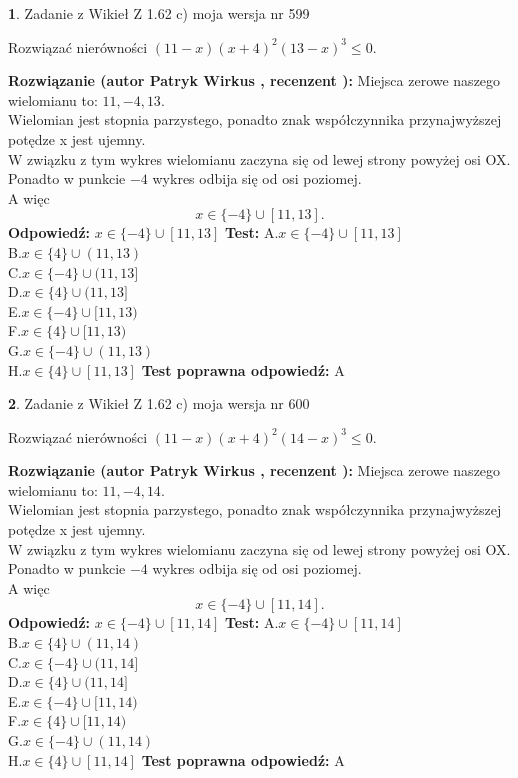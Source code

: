 \documentclass[12pt, a4paper]{article}
\theoremstyle{definition} %
\newtheorem{zad}{}
\newcommand{\zadStart}[1]{\begin{zad}#1\newline}
\newcommand{\zadStop}{\end{zad}}
\newcommand{\rozwStart}[2]{\noindent \textbf{Rozwiązanie (autor #1 , recenzent #2): }\newline}
\newcommand{\rozwStop}{\newline}
\newcommand{\odpStart}{\noindent \textbf{Odpowiedź:}\newline}
\newcommand{\odpStop}{\newline}
\newcommand{\testStart}{\noindent \textbf{Test:}\newline}
\newcommand{\testStop}{\newline}
\newcommand{\kluczStart}{\noindent \textbf{Test poprawna odpowiedź:}\newline}
\newcommand{\kluczStop}{\newline}
\begin{document}
\zadStart{Zadanie z Wikieł Z 1.62 c) moja wersja nr 599}

Rozwiązać nierówności $(11-x)(x+4)^{2}(13-x)^{3}\le0$.
\zadStop
\rozwStart{Patryk Wirkus}{}
Miejsca zerowe naszego wielomianu to: $11, -4, 13$.\\
Wielomian jest stopnia parzystego, ponadto znak współczynnika przy\linebreak najwyższej potędze x jest ujemny.\\ W związku z tym wykres wielomianu zaczyna się od lewej strony powyżej osi OX.\\
Ponadto w punkcie $-4$ wykres odbija się od osi poziomej.\\
A więc $$x \in \{-4\} \cup [11,13].$$
\rozwStop
\odpStart
$x \in \{-4\} \cup [11,13]$
\odpStop
\testStart
A.$x \in \{-4\} \cup [11,13]$\\
B.$x \in \{4\} \cup (11,13)$\\
C.$x \in \{-4\} \cup (11,13]$\\
D.$x \in \{4\} \cup (11,13]$\\
E.$x \in \{-4\} \cup [11,13)$\\
F.$x \in \{4\} \cup [11,13)$\\
G.$x \in \{-4\} \cup (11,13)$\\
H.$x \in \{4\} \cup [11,13]$
\testStop
\kluczStart
A
\kluczStop



\zadStart{Zadanie z Wikieł Z 1.62 c) moja wersja nr 600}

Rozwiązać nierówności $(11-x)(x+4)^{2}(14-x)^{3}\le0$.
\zadStop
\rozwStart{Patryk Wirkus}{}
Miejsca zerowe naszego wielomianu to: $11, -4, 14$.\\
Wielomian jest stopnia parzystego, ponadto znak współczynnika przy\linebreak najwyższej potędze x jest ujemny.\\ W związku z tym wykres wielomianu zaczyna się od lewej strony powyżej osi OX.\\
Ponadto w punkcie $-4$ wykres odbija się od osi poziomej.\\
A więc $$x \in \{-4\} \cup [11,14].$$
\rozwStop
\odpStart
$x \in \{-4\} \cup [11,14]$
\odpStop
\testStart
A.$x \in \{-4\} \cup [11,14]$\\
B.$x \in \{4\} \cup (11,14)$\\
C.$x \in \{-4\} \cup (11,14]$\\
D.$x \in \{4\} \cup (11,14]$\\
E.$x \in \{-4\} \cup [11,14)$\\
F.$x \in \{4\} \cup [11,14)$\\
G.$x \in \{-4\} \cup (11,14)$\\
H.$x \in \{4\} \cup [11,14]$
\testStop
\kluczStart
A
\kluczStop
\end{document}
